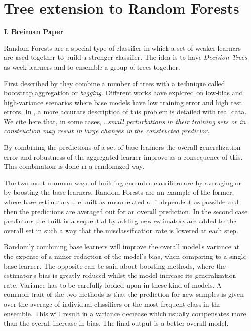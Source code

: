 \section{Tree extension to Random Forests}
\textbf{L Breiman Paper}\cite{breiman-randomforests}

Random Forests are a special type of classifier in which a set of weaker learners are used together to build a stronger classifier. The idea is to have \textit{Decision Trees} as week learners and to ensemble a group of trees together. 

 First described by \cite{HoFirstRandomForest} they combine a number of trees with a technique called bootstrap aggregation or \textit{bagging}. Different works have explored on low-bias and high-variance scenarios where base models have low training error and high test errors. In \cite{breiman-arcingclassifiers}, a more accurate description of this problem is detailed with  real data. We cite here that, in some cases, \textit{..small perturbations in their  training  sets  or  in  construction  may  result  in  large  changes  in  the  constructed  predictor}.

By combining the predictions of a set of base learners the overall generalization error and robustness of the aggregated learner improve as a consequence of this. This combination is done in a randomized way.

The two most common ways of building ensemble classifiers are by averaging or by boosting the base learners. Random Forests are an example of the former, where base estimators are built as uncorrelated or independent as possible and then the predictions are averaged out for an overall prediction. In the second case predictors are built in a sequential by adding new estimators are added to the overall set in such a way that the misclassification rate is lowered at each step.

Randomly combining base learners will improve the overall model's variance at the expense of a minor reduction of the model's bias, when comparing to a single base learner. The opposite can be said about boosting methods, where the estimator's bias is greatly reduced whilst the model increase its generalization rate. Variance has to be carefully looked upon in these kind of models. A common trait of the two methods is that the prediction for new samples is given over the average of individual classifiers or the most frequent class in the ensemble.   This will result in a variance decrease which usually compensates more than the overall increase in bias. The final output is a better overall model. 

